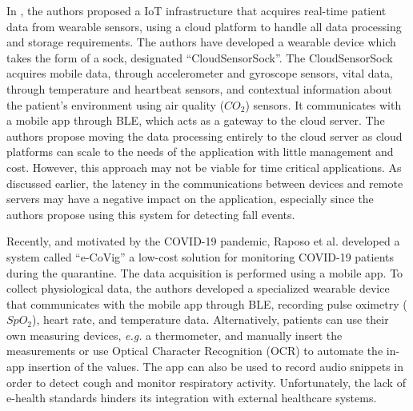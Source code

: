 In \cite{Doukas2012}, the authors proposed a \acs{IoT} infrastructure that acquires real-time patient data from wearable sensors, using a cloud platform to handle all data processing and storage requirements. The authors have developed a wearable device which takes the form of a sock, designated ``CloudSensorSock''. The CloudSensorSock acquires mobile data, through accelerometer and gyroscope sensors, vital data, through temperature and heartbeat sensors, and contextual information about the patient's environment using air quality ($CO_2$) sensors. It communicates with a mobile app through \acs{BLE}, which acts as a gateway to the cloud server. The authors propose moving the data processing entirely to the cloud server as cloud platforms can scale to the needs of the application with little management and cost. However, this approach may not be viable for time critical applications. As discussed earlier, the latency in the communications between devices and remote servers may have a negative impact on the application, especially since the authors propose using this system for detecting fall events. \bigskip

%
%

Recently, and motivated by the COVID-19 pandemic, Raposo et al. \cite{Raposo2021} developed a system called ``e-CoVig'' a low-cost solution for monitoring COVID-19 patients during the quarantine.%
The data acquisition is performed using a mobile app. To collect physiological data, the authors developed a specialized wearable device that communicates with the mobile app through \acs{BLE}, recording pulse oximetry ($SpO_2$), heart rate, and temperature data. Alternatively, patients can use their own measuring devices, \textit{e.g.} a thermometer, and manually insert the measurements or use Optical Character Recognition (OCR) to automate the in-app insertion of the values. The app can also be used to record audio snippets in order to detect cough and monitor respiratory activity. Unfortunately, the lack of e-health standards hinders its integration with external healthcare systems. 

